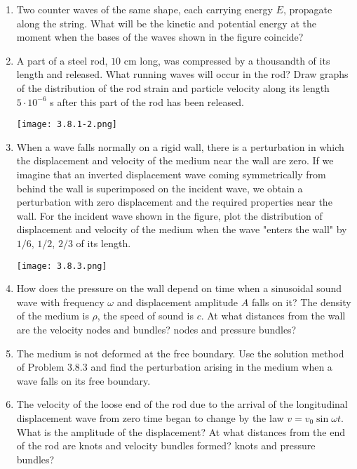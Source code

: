 \documentclass{article}
\begin{document}
\begin{enumerate}[label=3.8.\arabic*]

\item Two counter waves of the same shape, each carrying energy $E$, propagate along the string. What will be the kinetic and potential energy at the moment when the bases of the waves shown in the figure coincide?

\item A part of a steel rod, $10$ cm long, was compressed by a thousandth of its length and released. What running waves will occur in the rod? Draw graphs of the distribution of the rod strain and particle velocity along its length $5 \cdot 10^{-6}$ s after this part of the rod has been released.

\begin{center}
    \texttt{[image: 3.8.1-2.png]}
\end{center}


\item When a wave falls normally on a rigid wall, there is a perturbation in which the displacement and velocity of the medium near the wall are zero. If we imagine that an inverted displacement wave coming symmetrically from behind the wall is superimposed on the incident wave, we obtain a perturbation with zero displacement and the required properties near the wall. For the incident wave shown in the figure, plot the distribution of displacement and velocity of the medium when the wave "enters the wall" by $1/6$, $1/2$, $2/3$ of its length.

\begin{center}
    \texttt{[image: 3.8.3.png]}
\end{center}

\item How does the pressure on the wall depend on time when a sinusoidal sound wave with frequency $\omega$ and displacement amplitude $A$ falls on it? The density of the medium is $\rho$, the speed of sound is $c$. At what distances from the wall are the velocity nodes and bundles? nodes and pressure bundles?

\item The medium is not deformed at the free boundary. Use the solution method of Problem 3.8.3 and find the perturbation arising in the medium when a wave falls on its free boundary.

\item The velocity of the loose end of the rod due to the arrival of the longitudinal displacement wave from zero time began to change by the law $v = v_0 \sin{\omega t}$. What is the amplitude of the displacement? At what distances from the end of the rod are knots and velocity bundles formed? knots and pressure bundles?


\end{enumerate}
\end{document}
